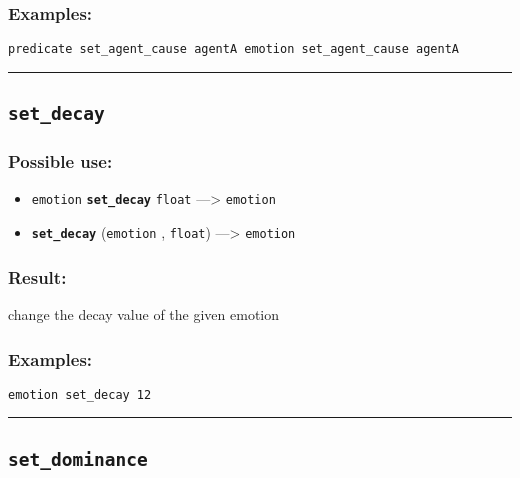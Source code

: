 \documentclass[]{book}
\providecommand{\tightlist}{%
  \setlength{\itemsep}{0pt}\setlength{\parskip}{0pt}}
\theoremstyle{definition}
\theoremstyle{definition}
\theoremstyle{definition}
\theoremstyle{remark}
\begin{document}
\subsubsection{Examples:}\label{examples-313}

\begin{verbatim}
predicate set_agent_cause agentA emotion set_agent_cause agentA 
\end{verbatim}

\begin{center}\rule{0.5\linewidth}{\linethickness}\end{center}

\subsection{\texorpdfstring{\texttt{set\_decay}}{set\_decay}}\label{set_decay}

\subsubsection{Possible use:}\label{possible-use-457}

\begin{itemize}
\tightlist
\item
  \texttt{emotion} \textbf{\texttt{set\_decay}} \texttt{float}
  ---\textgreater{} \texttt{emotion}
\item
  \textbf{\texttt{set\_decay}} (\texttt{emotion} , \texttt{float})
  ---\textgreater{} \texttt{emotion}
\end{itemize}

\subsubsection{Result:}\label{result-441}

change the decay value of the given emotion

\subsubsection{Examples:}\label{examples-314}

\begin{verbatim}
emotion set_decay 12 
\end{verbatim}

\begin{center}\rule{0.5\linewidth}{\linethickness}\end{center}

\subsection{\texorpdfstring{\texttt{set\_dominance}}{set\_dominance}}\label{set_dominance}
\end{document}
